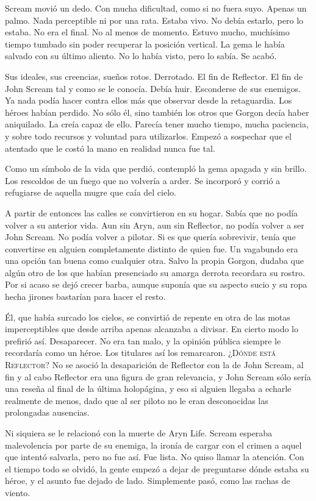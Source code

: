 Scream movió un dedo. Con mucha dificultad, como si no fuera suyo. Apenas un palmo. Nada perceptible ni por una rata. Estaba vivo. No debía estarlo, pero lo estaba. No era el final. No al menos de momento. Estuvo mucho, muchísimo tiempo tumbado sin poder recuperar la posición vertical. La gema le había salvado con su último aliento. No lo había visto, pero lo sabía. Se acabó.

Sus ideales, sus creencias, sueños rotos. Derrotado. El fin de Reflector. El fin de John Scream tal y como se le conocía. Debía huir. Esconderse de sus enemigos. Ya nada podía hacer contra ellos más que observar desde la retaguardia. Los héroes habían perdido. No sólo él, sino también los otros que Gorgon decía haber aniquilado. La creía capaz de ello. Parecía tener mucho tiempo, mucha paciencia, y sobre todo recursos y voluntad para utilizarlos. Empezó a sospechar que el atentado que le costó la mano en realidad nunca fue tal.

Como un símbolo de la vida que perdió, contempló la gema apagada y sin brillo. Los rescoldos de un fuego que no volvería a arder. Se incorporó y corrió a refugiarse de aquella mugre que caía del cielo.

A partir de entonces las calles se convirtieron en su hogar. Sabía que no podía volver a su anterior vida. Aun sin Aryn, aun sin Reflector, no podía volver a ser John Scream. No podía volver a pilotar. Si es que quería sobrevivir, tenía que convertirse en alguien completamente distinto de quien fue. Un vagabundo era una opción tan buena como cualquier otra. Salvo la propia Gorgon, dudaba que algún otro de los que habían presenciado su amarga derrota recordara su rostro. Por si acaso se dejó crecer barba, aunque suponía que su aspecto sucio y su ropa hecha jirones bastarían para hacer el resto.

Él, que había surcado los cielos, se convirtió de repente en otra de las motas imperceptibles que desde arriba apenas alcanzaba a divisar. En cierto modo lo prefirió así. Desaparecer. No era tan malo, y la opinión pública siempre le recordaría como un héroe. Los titulares así los remarcaron. \textsc{¿Dónde está Reflector?} No se asoció la desaparición de Reflector con la de John Scream, al fin y al cabo Reflector era una figura de gran relevancia, y John Scream sólo sería una reseña al final de la última holopágina, y eso si alguien llegaba a echarle realmente de menos, dado que al ser piloto no le eran desconocidas las prolongadas ausencias.

Ni siquiera se le relacionó con la muerte de Aryn Life. Scream esperaba malevolencia por parte de su enemiga, la ironía de cargar con el crimen a aquel que intentó salvarla, pero no fue así. Fue lista. No quiso llamar la atención. Con el tiempo todo se olvidó, la gente empezó a dejar de preguntarse dónde estaba su héroe, y el asunto fue dejado de lado. Simplemente pasó, como las rachas de viento.

